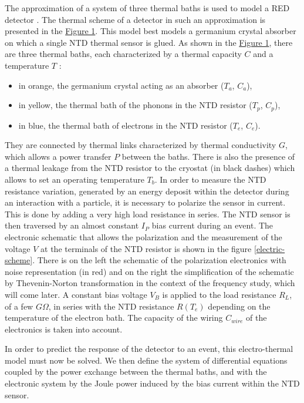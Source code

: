 The approximation of a system of three thermal baths is used to model a RED detector \cite{note}. The thermal scheme of a detector in such an approximation is presented in the \hyperref[thermal-scheme]{Figure 1}. This model best models a germanium crystal absorber on which a single NTD thermal sensor is glued. As shown in the \hyperref[thermal-scheme]{Figure 1}, there are three thermal baths, each characterized by a thermal capacity $C$ and a temperature $T$ :
\begin{itemize}
\item in orange, the germanium crystal acting as an absorber ($T_a$, $C_a$),
\item in yellow, the thermal bath of the phonons in the NTD resistor ($T_p$, $C_p$),
\item in blue, the thermal bath of electrons in the NTD resistor ($T_e$, $C_e$).
\end{itemize}
They are connected by thermal links characterized by thermal conductivity $G$, which allows a power transfer $P$ between the baths. There is also the presence of a thermal leakage from the NTD resistor to the cryostat (in black dashes) which allows to set an operating temperature $T_b$.
In order to measure the NTD resistance variation, generated by an energy deposit within the detector during an interaction with a particle, it is necessary to polarize the sensor in current. This is done by adding a very high load resistance in series. The NTD sensor is then traversed by an almost constant $I_P$ bias current during an event. The electronic schematic that allows the polarization and the measurement of the voltage $V$ at the terminals of the NTD resistor is shown in the figure \ref{electric-scheme}. There is on the left the schematic of the polarization electronics with noise representation (in red) and on the right the simplification of the schematic by Thevenin-Norton transformation \cite{mather} in the context of the frequency study, which will come later. A constant bias voltage $V_B$ is applied to the load resistance $R_L$, of a few $G\Omega$, in series with the NTD resistance $R(T_e)$ depending on the temperature of the electron bath. The capacity of the wiring $C_{wire}$ of the electronics is taken into account.

In order to predict the response of the detector to an event, this electro-thermal model must now be solved. We then define the system of differential equations coupled by the power exchange between the thermal baths, and with the electronic system by the Joule power induced by the bias current within the NTD sensor.

